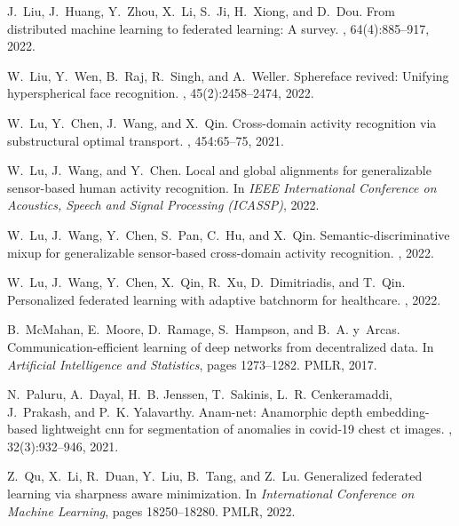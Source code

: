 \documentclass[11pt]{article}
\begin{document}
\begin{thebibliography}{10}
J.~Liu, J.~Huang, Y.~Zhou, X.~Li, S.~Ji, H.~Xiong, and D.~Dou.
\newblock From distributed machine learning to federated learning: A survey.
, 64(4):885--917, 2022.

W.~Liu, Y.~Wen, B.~Raj, R.~Singh, and A.~Weller.
\newblock Sphereface revived: Unifying hyperspherical face recognition.
,
  45(2):2458--2474, 2022.

W.~Lu, Y.~Chen, J.~Wang, and X.~Qin.
\newblock Cross-domain activity recognition via substructural optimal
  transport.
, 454:65--75, 2021.

W.~Lu, J.~Wang, and Y.~Chen.
\newblock Local and global alignments for generalizable sensor-based human
  activity recognition.
\newblock In {\em IEEE International Conference on Acoustics, Speech and Signal
  Processing (ICASSP)}, 2022.

W.~Lu, J.~Wang, Y.~Chen, S.~Pan, C.~Hu, and X.~Qin.
\newblock Semantic-discriminative mixup for generalizable sensor-based
  cross-domain activity recognition.
, 2022.

W.~Lu, J.~Wang, Y.~Chen, X.~Qin, R.~Xu, D.~Dimitriadis, and T.~Qin.
\newblock Personalized federated learning with adaptive batchnorm for
  healthcare.
, 2022.

B.~McMahan, E.~Moore, D.~Ramage, S.~Hampson, and B.~A. y~Arcas.
\newblock Communication-efficient learning of deep networks from decentralized
  data.
\newblock In {\em Artificial Intelligence and Statistics}, pages 1273--1282.
  PMLR, 2017.

N.~Paluru, A.~Dayal, H.~B. Jenssen, T.~Sakinis, L.~R. Cenkeramaddi, J.~Prakash,
  and P.~K. Yalavarthy.
\newblock Anam-net: Anamorphic depth embedding-based lightweight cnn for
  segmentation of anomalies in covid-19 chest ct images.
,
  32(3):932--946, 2021.

Z.~Qu, X.~Li, R.~Duan, Y.~Liu, B.~Tang, and Z.~Lu.
\newblock Generalized federated learning via sharpness aware minimization.
\newblock In {\em International Conference on Machine Learning}, pages
  18250--18280. PMLR, 2022.


\end{thebibliography}
\end{document}
